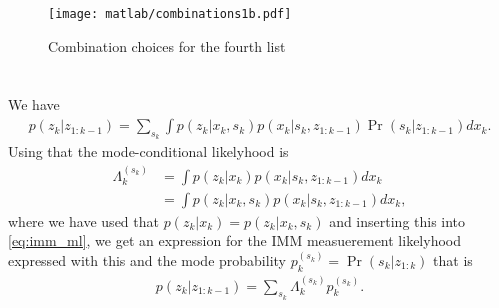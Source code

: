 \documentclass[]{article}
\begin{document}
\begin{figure}[H]
\centering
\label{fig:combinations}
\texttt{[image: matlab/combinations1b.pdf]}
\caption{Combination choices for the fourth list}
\end{figure}

\section{}
\subsection{}
We have
\begin{equation}\begin{aligned}
\label{eq:imm_ml}
p(z_k | z_{1:k-1}) = \sum_{s_k}\int p(z_k | x_k, s_k) p(x_k | s_k, z_{1:k-1}) \Pr(s_k | z_{1:k-1})dx_k.
\end{aligned}\end{equation}
Using that the mode-conditional likelyhood is
\begin{equation}\begin{aligned}
\Lambda^{(s_k)}_k &= \int p(z_k | x_k) p(x_k | s_k, z_{1:k-1})dx_k \\
&= \int p(z_k | x_k, s_k) p(x_k | s_k, z_{1:k-1})dx_k,
\end{aligned}\end{equation}
where we have used that $p(z_k | x_k) = p(z_k | x_k, s_k)$ and inserting this into \eqref{eq:imm_ml}, we get an expression for the IMM measuerement likelyhood expressed with this and the mode probability $p_k^{(s_k)} = \Pr(s_k | z_{1:k})$ that is
\begin{equation}\begin{aligned}
p(z_k | z_{1:k-1}) = \sum_{s_k}\Lambda_k^{(s_k)}p_k^{(s_k)}.
\end{aligned}\end{equation}

\subsection{}
\end{document}
